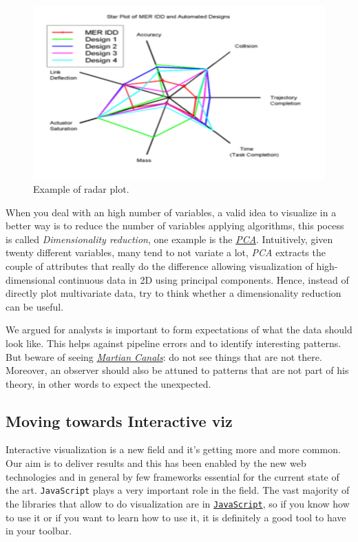 \begin{itemize}
\begin{itemize}
\begin{figure}[h]%
 \centering
 \includegraphics[width=13cm]{./img/06/radar}
 \caption{\label{pic:radar} Example of radar plot.}
\end{figure}
\end{itemize}
\end{itemize}


When you deal with an high number of variables, a valid idea to visualize in a better way is to reduce the number of variables applying algorithms, this pocess is called \emph{Dimensionality reduction}, one example is the \href{https://en.wikipedia.org/wiki/Principal\_component\_analysis}{ \emph{PCA}}. Intuitively, given twenty different variables, many tend to not variate a lot, \emph{PCA} extracts the couple of attributes that really do the difference allowing visualization of high-dimensional continuous data in 2D using principal components. Hence, instead of directly plot multivariate data, try to think whether a dimensionality reduction can be useful.

We argued for analysts is important to form expectations of what the data should look like. This helps against pipeline errors and to identify interesting patterns. But beware of seeing \href{https://en.wikipedia.org/wiki/Martian1_canal}{\emph{Martian Canals}}: do not see things that are not there. Moreover, an observer should also be attuned to patterns that are not part of his theory, in other words to expect the unexpected. 


\subsection{Moving towards Interactive viz}

Interactive visualization is a new field and it's getting more and more common. Our aim is to deliver results and this has been enabled by the new web technologies and in general by few frameworks essential for the current state of the art. \texttt{JavaScript} plays a very important role in the field. The vast majority of the libraries that allow to do visualization are in \href{https://www.codecademy.com/learn/javascript}{\texttt{JavaScript}}, so if you know how to use it or if you want to learn how to use it, it is definitely a good tool to have in your toolbar. 

